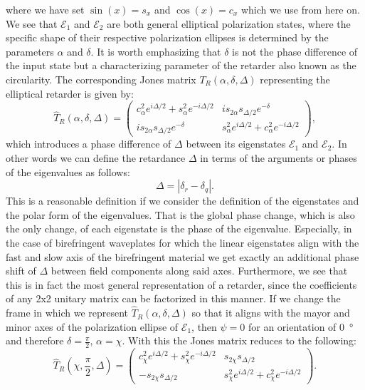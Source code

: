 where we have set $\sin(x) = s_x$ and $\cos(x) = c_x$ which we use from here on. We see that $\bm{\mathcal{E}}_1$ and $\bm{\mathcal{E}}_2$ are both general elliptical polarization states, where the specific shape of their respective polarization ellipses is determined by the parameters $\alpha$ and $\delta$. It is worth emphasizing that $\delta$ is not the phase difference of the input state but a characterizing parameter of the retarder also known as the circularity. The corresponding Jones matrix $T_R(\alpha, \delta, \Delta)$ representing the elliptical retarder is given by:
\begin{equation}
    \hat{T}_R(\alpha, \delta, \Delta) = 
    \begin{pmatrix} 
    c^2_{\alpha}  e^{i\Delta /2} + s^2_{\alpha} e^{-i\Delta /2} & i s_{2\alpha} s_{\Delta/2} e^{-\delta} \\ 
    i s_{2\alpha} s_{\Delta/2} e^{-\delta} & s^2_{\alpha} e^{i\Delta/2} + c^2_{\alpha} e^{-i\Delta /2}
    \end{pmatrix}, 
\end{equation}
which introduces a phase difference of $\Delta$ between its eigenstates $\bm{\mathcal{E}}_1$ and $\bm{\mathcal{E}}_2$. In other words we can define the retardance $\Delta$ in terms of the arguments or phases of the eigenvalues as follows:
\begin{equation}
    \label{eq:jones_ret_def}
    \Delta = |\delta_r-\delta_q|.
\end{equation}
This is a reasonable definition if we consider the definition of the eigenstates and the polar form of the eigenvalues. That is the global phase change, which is also the only change, of each eigenstate is the phase of the eigenvalue. Especially, in the case of birefringent waveplates for which the linear eigenstates align with the fast and slow axis of the birefringent material we get exactly an additional phase shift of $\Delta$ between field components along said axes. Furthermore, we see that this is in fact the most general representation of a retarder, since the coefficients of any 2x2 unitary matrix can be factorized in this manner. If we change the frame in which we represent $\hat{T}_R(\alpha, \delta, \Delta)$ so that it aligns with the mayor and minor axes of the polarization ellipse of $\bm{\mathcal{E}}_1$, then $\psi=0$ for an orientation of \SI{0}{\degree} and therefore $\delta=\frac{\pi}{2}$, $\alpha=\chi$. With this the Jones matrix reduces to the following:
\begin{equation}
    \hat{T}_R\left(\chi, \frac{\pi}{2}, \Delta\right) = 
    \begin{pmatrix} 
    c^2_{\chi} e^{i\Delta /2} + s^2_{\chi} e^{-i\Delta /2} & s_{2\chi} s_{\Delta/2} \\
    -s_{2\chi} s_{\Delta/2} & s^2_{\chi} e^{i\Delta /2} + c^2_{\chi} e^{-i\Delta /2}
    \end{pmatrix}. 
\end{equation}

